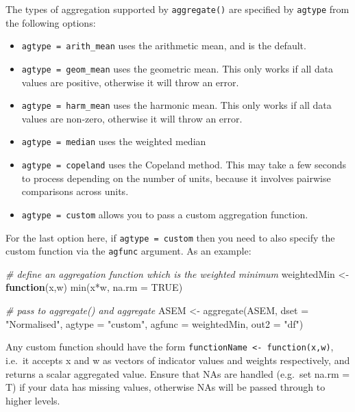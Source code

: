 \documentclass[
]{book}
\newenvironment{Shaded}{\begin{snugshade}}{\end{snugshade}}
\newcommand{\AttributeTok}[1]{\textcolor[rgb]{0.77,0.63,0.00}{#1}}
\newcommand{\CommentTok}[1]{\textcolor[rgb]{0.56,0.35,0.01}{\textit{#1}}}
\newcommand{\ConstantTok}[1]{\textcolor[rgb]{0.00,0.00,0.00}{#1}}
\newcommand{\ControlFlowTok}[1]{\textcolor[rgb]{0.13,0.29,0.53}{\textbf{#1}}}
\newcommand{\FunctionTok}[1]{\textcolor[rgb]{0.00,0.00,0.00}{#1}}
\newcommand{\NormalTok}[1]{#1}
\newcommand{\OtherTok}[1]{\textcolor[rgb]{0.56,0.35,0.01}{#1}}
\newcommand{\SpecialCharTok}[1]{\textcolor[rgb]{0.00,0.00,0.00}{#1}}
\newcommand{\StringTok}[1]{\textcolor[rgb]{0.31,0.60,0.02}{#1}}
\providecommand{\tightlist}{%
  \setlength{\itemsep}{0pt}\setlength{\parskip}{0pt}}
\begin{document}
The types of aggregation supported by \texttt{aggregate()} are specified by \texttt{agtype} from the following options:

\begin{itemize}
\tightlist
\item
  \texttt{agtype\ =\ arith\_mean} uses the arithmetic mean, and is the default.
\item
  \texttt{agtype\ =\ geom\_mean} uses the geometric mean. This only works if all data values are positive, otherwise it will throw an error.
\item
  \texttt{agtype\ =\ harm\_mean} uses the harmonic mean. This only works if all data values are non-zero, otherwise it will throw an error.
\item
  \texttt{agtype\ =\ median} uses the weighted median
\item
  \texttt{agtype\ =\ copeland} uses the Copeland method. This may take a few seconds to process depending on the number of units, because it involves pairwise comparisons across units.
\item
  \texttt{agtype\ =\ custom} allows you to pass a custom aggregation function.
\end{itemize}

For the last option here, if \texttt{agtype\ =\ custom} then you need to also specify the custom function via the \texttt{agfunc} argument. As an example:

\begin{Shaded}
\begin{Highlighting}[]
\CommentTok{\# define an aggregation function which is the weighted minimum}
\NormalTok{weightedMin }\OtherTok{\textless{}{-}} \ControlFlowTok{function}\NormalTok{(x,w) }\FunctionTok{min}\NormalTok{(x}\SpecialCharTok{*}\NormalTok{w, }\AttributeTok{na.rm =} \ConstantTok{TRUE}\NormalTok{)}

\CommentTok{\# pass to aggregate() and aggregate}
\NormalTok{ASEM }\OtherTok{\textless{}{-}} \FunctionTok{aggregate}\NormalTok{(ASEM, }\AttributeTok{dset =} \StringTok{"Normalised"}\NormalTok{, }\AttributeTok{agtype =} \StringTok{"custom"}\NormalTok{,}
                  \AttributeTok{agfunc =}\NormalTok{ weightedMin, }\AttributeTok{out2 =} \StringTok{"df"}\NormalTok{)}
\end{Highlighting}
\end{Shaded}

Any custom function should have the form \texttt{functionName\ \textless{}-\ function(x,w)}, i.e.~it accepts x and w as vectors of indicator values and weights respectively, and returns a scalar aggregated value. Ensure that NAs are handled (e.g.~set na.rm = T) if your data has missing values, otherwise NAs will be passed through to higher levels.
\end{document}
